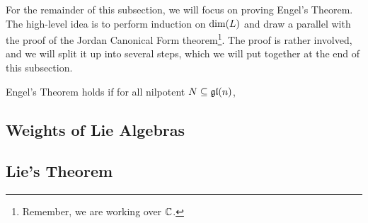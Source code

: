 For the remainder of this subsection, we will focus on proving Engel's Theorem. The high-level idea is to perform induction on $\dim\!\left( L \right)$ and draw a parallel with the proof of the Jordan Canonical Form theorem\footnote{Remember, we are working over $\mathbb{C}$.}. The proof is rather involved, and we will split it up into several steps, which we will put together at the end of this subsection.

\begin{lemma}
    Engel's Theorem holds if for all nilpotent $N \subseteq \mathfrak{gl}\!\left( n \right)$, 
\end{lemma}

\subsection{Weights of Lie Algebras}

\subsection{Lie's Theorem}

